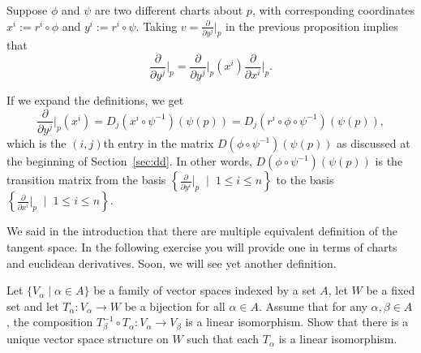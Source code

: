 \begin{remark}\label{rmk:chg_coords}
  Suppose $\phi$ and $\psi$ are two different charts about $p$, with corresponding coordinates $x^i := r^i \circ \phi$ and $y^i := r^i \circ \psi$.
  Taking $v = \frac{\partial}{\partial y^j}\Big|_p$ in the previous proposition implies that
  \begin{equation}
    \frac{\partial}{\partial y^j}\Big|_p = 
    \frac{\partial}{\partial y^j}\Big|_p (x^i) \frac{\partial}{\partial x^i}\Big|_p.
  \end{equation}

  If we expand the definitions, we get
  \begin{equation}
    \frac{\partial}{\partial y^j}\Big|_p (x^i) =
    D_j(x^i\circ\psi^{-1})(\psi(p)) =
    D_j(r^i \circ \phi \circ \psi^{-1})(\psi(p)),
  \end{equation}
  which is the $(i,j)$th entry in the matrix $D(\phi\circ\psi^{-1})(\psi(p))$ as discussed at the beginning of Section~\ref{sec:dd}.
  In other words, $D(\phi\circ\psi^{-1})(\psi(p))$ is the transition matrix from the basis $\left\{\frac{\partial}{\partial y^i}\Big|_p\;\mid\; 1\leq i\leq n\right\}$ to the basis $\left\{\frac{\partial}{\partial x^i}\Big|_p\;\mid\; 1\leq i\leq n\right\}$.
\end{remark}

We said in the introduction that there are multiple equivalent definition of the tangent space. In the following exercise you will provide one in terms of charts and euclidean derivatives.
Soon, we will see yet another definition.

\begin{exercise}\label{exe:vsstruct}
  Let $\{V_\alpha \mid \alpha\in A\}$ be a family of vector spaces indexed by a set $A$, let $W$ be a fixed set and let $T_\alpha: V_\alpha\to W$ be a bijection for all $\alpha\in A$.
  Assume that for any $\alpha, \beta \in A$, the composition $T_\beta^{-1}\circ T_\alpha : V_\alpha \to V_\beta$ is a linear isomorphism.
  Show that there is a unique vector space structure on $W$ such that each $T_\alpha$ is a linear isomorphism.
\end{exercise}

